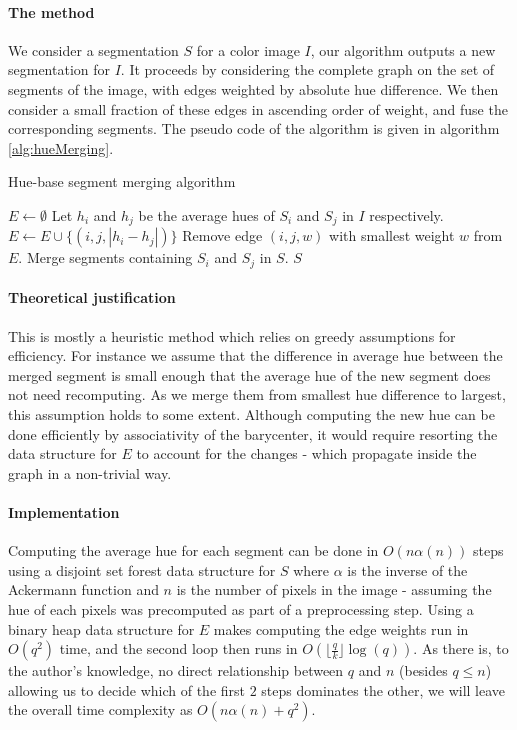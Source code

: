 \paragraph{The method} We consider a segmentation $S$ for a color image $I$, our algorithm outputs a new segmentation for $I$. It proceeds by considering the complete graph on the set of segments of the image, with edges weighted by absolute hue difference. We then consider a small fraction of these edges in ascending order of weight, and fuse the corresponding segments. The pseudo code of the algorithm is given in algorithm \autoref{alg:hueMerging}.

\begin{algorithm}
\caption{Hue-base segment merging algorithm}
\label{alg:hueMerging}

\begin{algorithmic}[1]
\State $E \gets \emptyset$
\State Let $h_i$ and $h_j$ be the average hues of $S_i$ and $S_j$ in $I$ respectively.
\State $E \gets E \cup \{(i, j, |h_i - h_j| )\}$
\EndFor
{}
\State Remove edge $(i,j,w)$ with smallest weight $w$ from $E$.
\State Merge segments containing $S_i$ and $S_j$ in $S$.
\EndFor
\Return $S$
\EndFunction
\end{algorithmic}
\end{algorithm}

\paragraph{Theoretical justification} This is mostly a heuristic method which relies on greedy assumptions for efficiency. For instance we assume that the difference in average hue between the merged segment is small enough that the average hue of the new segment does not need recomputing. As we merge them from smallest hue difference to largest, this assumption holds to some extent. Although computing the new hue can be done efficiently by associativity of the barycenter, it would require resorting the data structure for $E$ to account for the changes - which propagate inside the graph in a non-trivial way.

\paragraph{Implementation} Computing the average hue for each segment can be done in $O(n\alpha(n))$ steps using a disjoint set forest data structure for $S$ where $\alpha$ is the inverse of the Ackermann function and $n$ is the number of pixels in the image - assuming the hue of each pixels was precomputed as part of a preprocessing step. Using a binary heap data structure for $E$ makes computing the edge weights run in $O(q^2)$ time, and the second loop then runs in $O(\lfloor \frac{q}{k} \rfloor \log(q))$. As there is, to the author's knowledge, no direct relationship between $q$ and $n$ (besides $q \leq n$) allowing us to decide which of the first $2$ steps dominates the other, we will leave the overall time complexity as $O(n\alpha(n) + q^2)$.

